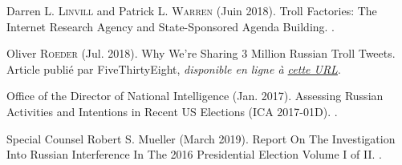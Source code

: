 \documentclass[twocolumn,10pt]{article}
\begin{document}

\begin{thebibliography}{99}

Darren L. \textsc{Linvill} and Patrick L. \textsc{Warren} (Juin 2018). 
\newblock Troll Factories: The Internet Research Agency and State-Sponsored Agenda Building. 
. 

Oliver \textsc{Roeder} (Jul. 2018).
\newblock Why We’re Sharing 3 Million Russian Troll Tweets.
\newblock Article publié par FiveThirtyEight, {\em disponible en ligne à \href{https://fivethirtyeight.com/features/why-were-sharing-3-million-russian-troll-tweets/}{cette URL}}.

Office of the Director of National Intelligence (Jan. 2017).
\newblock Assessing Russian Activities and Intentions in Recent US Elections (ICA 2017-01D).
.

Special Counsel Robert S. Mueller (March 2019).
\newblock Report On The Investigation Into Russian Interference In The 2016 Presidential Election Volume I of II.
.
\end{thebibliography}




\end{document}
